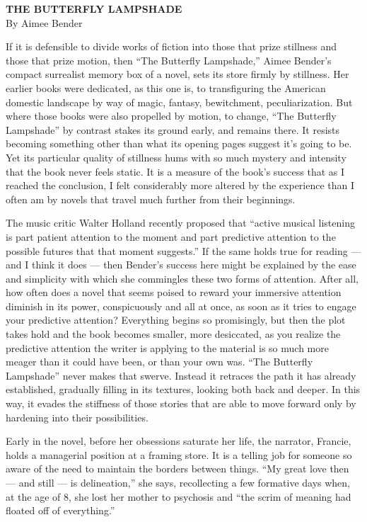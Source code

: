 \textbf{THE BUTTERFLY LAMPSHADE}\\
By Aimee Bender

If it is defensible to divide works of fiction into those that prize
stillness and those that prize motion, then ``The Butterfly Lampshade,''
Aimee Bender's compact surrealist memory box of a novel, sets its store
firmly by stillness. Her earlier books were dedicated, as this one is,
to transfiguring the American domestic landscape by way of magic,
fantasy, bewitchment, peculiarization. But where those books were also
propelled by motion, to change, ``The Butterfly Lampshade'' by contrast
stakes its ground early, and remains there. It resists becoming
something other than what its opening pages suggest it's going to be.
Yet its particular quality of stillness hums with so much mystery and
intensity that the book never feels static. It is a measure of the
book's success that as I reached the conclusion, I felt considerably
more altered by the experience than I often am by novels that travel
much further from their beginnings.

The music critic Walter Holland recently proposed that ``active musical
listening is part patient attention to the moment and part predictive
attention to the possible futures that that moment suggests.'' If the
same holds true for reading --- and I think it does --- then Bender's
success here might be explained by the ease and simplicity with which
she commingles these two forms of attention. After all, how often does a
novel that seems poised to reward your immersive attention diminish in
its power, conspicuously and all at once, as soon as it tries to engage
your predictive attention? Everything begins so promisingly, but then
the plot takes hold and the book becomes smaller, more desiccated, as
you realize the predictive attention the writer is applying to the
material is so much more meager than it could have been, or than your
own was. ``The Butterfly Lampshade'' never makes that swerve. Instead it
retraces the path it has already established, gradually filling in its
textures, looking both back and deeper. In this way, it evades the
stiffness of those stories that are able to move forward only by
hardening into their possibilities.

Early in the novel, before her obsessions saturate her life, the
narrator, Francie, holds a managerial position at a framing store. It is
a telling job for someone so aware of the need to maintain the borders
between things. ``My great love then --- and still --- is delineation,''
she says, recollecting a few formative days when, at the age of 8, she
lost her mother to psychosis and ``the scrim of meaning had floated off
of everything.''

